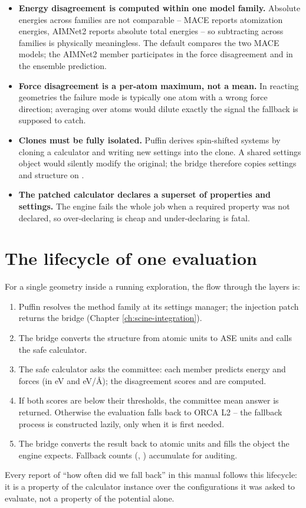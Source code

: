 \begin{itemize}
  \item \textbf{Energy disagreement is computed within one model family.}
    Absolute energies across families are not comparable -- MACE reports
    atomization energies, AIMNet2 reports absolute total energies -- so
    subtracting across families is physically meaningless.  The default
    compares the two MACE models; the AIMNet2 member participates in the
    force disagreement and in the ensemble prediction.
  \item \textbf{Force disagreement is a per-atom maximum, not a mean.}  In
    reacting geometries the failure mode is typically one atom with a wrong
    force direction; averaging over atoms would dilute exactly the signal
    the fallback is supposed to catch.
  \item \textbf{Clones must be fully isolated.}  Puffin derives
    spin-shifted systems by cloning a calculator and writing new settings
    into the clone.  A shared settings object would silently modify the
    original; the bridge therefore copies settings and structure on
    .
  \item \textbf{The patched calculator declares a superset of properties and
    settings.}  The engine fails the whole job when a required property was
    not declared, so over-declaring is cheap and under-declaring is fatal.
\end{itemize}

\section{The lifecycle of one evaluation}

For a single geometry inside a running exploration, the flow through the
layers is:

\begin{enumerate}
  \item Puffin resolves the method family at its settings manager; the
    injection patch returns the bridge (Chapter \ref{ch:scine-integration}).
  \item The bridge converts the structure from atomic units to ASE units and
    calls the safe calculator.
  \item The safe calculator asks the committee: each member predicts energy
    and forces (in eV and eV/\AA{}); the disagreement scores 
    and  are computed.
  \item If both scores are below their thresholds, the committee mean answer
    is returned.  Otherwise the evaluation falls back to ORCA L2 -- the
    fallback process is constructed lazily, only when it is first needed.
  \item The bridge converts the result back to atomic units and fills the
     object the engine expects.  Fallback counts
    (, ) accumulate for auditing.
\end{enumerate}

\begin{notebox}
Every report of ``how often did we fall back'' in this manual follows this
lifecycle: it is a property of the calculator instance over the
configurations it was asked to evaluate, not a property of the potential
alone.
\end{notebox}
